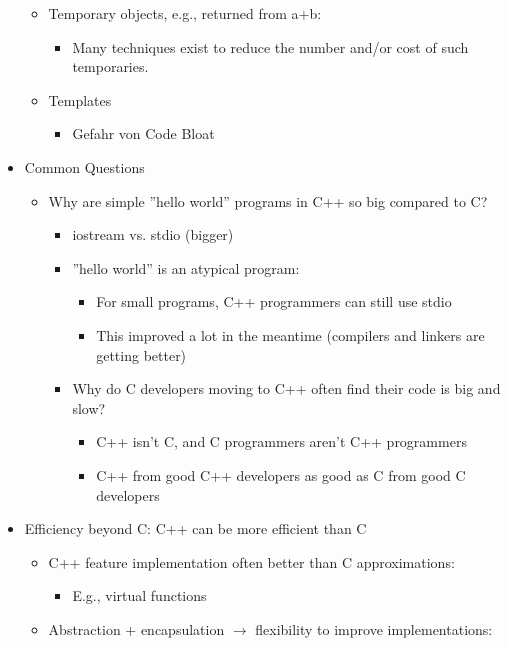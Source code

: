 \begin{itemize}
\begin{itemize}
			\item Temporary objects, e.g., returned from a+b:
			\begin{itemize}
				\item Many techniques exist to reduce the number and/or cost of such temporaries.
			\end{itemize}
			\item Templates
			\begin{itemize}
				\item Gefahr von Code Bloat
			\end{itemize}
		\end{itemize}
	\item Common Questions
	\begin{itemize}
		\item Why are simple ''hello world'' programs in C++ so big compared to C?
		\begin{itemize}
			\item iostream vs. stdio (bigger)
			\item ''hello world'' is an atypical program:
			\begin{itemize}
				\item For small programs, C++ programmers can still use stdio
				\item This improved a lot in the meantime (compilers and linkers are getting better)
			\end{itemize}
			\item Why do C developers moving to C++ often find their code is big and slow?
			\begin{itemize}
				\item C++ isn't C, and C programmers aren't C++ programmers
				\item C++ from good C++ developers as good as C from good C developers
			\end{itemize}
		\end{itemize}
	\end{itemize}
	\item Efficiency beyond C: C++ can be more efficient than C
	\begin{itemize}
		\item C++ feature implementation often better than C approximations:
		\begin{itemize}
			\item E.g., virtual functions
		\end{itemize}
		\item Abstraction + encapsulation $\rightarrow$ flexibility to improve implementations:

\end{itemize}
\end{itemize}
